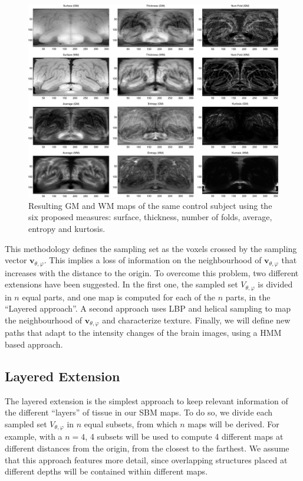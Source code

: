 \begin{figure}[htp]
	\myfloatalign
	\includegraphics[width=1\textwidth]{Graphics/ch6/03-projections}
	\caption{Resulting \acs{GM} and \acs{WM} maps of the same control subject using the six proposed measures: surface, thickness, number of folds, average, entropy and kurtosis.}
	\label{fig:masksGM}
\end{figure}

This methodology defines the sampling set as the voxels crossed by the sampling vector $\mathbf{v}_{\theta,\varphi}$. This implies a loss of information on the neighbourhood of $\mathbf{v}_{\theta,\varphi}$ that increases with the distance to the origin. To overcome this problem, two different extensions have been suggested. In the first one, the sampled set $V_{\theta,\varphi}$ is divided in $n$ equal parts, and one map is computed for each of the $n$ parts, in the ``Layered approach''. A second approach uses \acf{LBP} and helical sampling to map the neighbourhood of $\mathbf{v}_{\theta,\varphi}$ and characterize texture. Finally, we will define new paths that adapt to the intensity changes of the brain images, using a \ac{HMM} based approach. 

\subsection{Layered Extension}\label{sec:layered}
The layered extension is the simplest approach to keep relevant information of the different ``layers'' of tissue in our \ac{SBM} maps. To do so, we divide each sampled set $V_{\theta,\varphi}$ in $n$ equal subsets, from which $n$ maps will be derived. For example, with a $n=4$, 4 subsets will be used to compute 4 different maps at different distances from the origin, from the closest to the farthest. We assume that this approach features more detail, since overlapping structures placed at different depths will be contained within different maps. 

